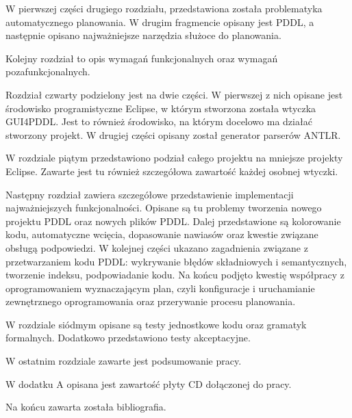 W pierwszej części drugiego rozdziału, przedstawiona została problematyka automatycznego planowania. W drugim fragmencie opisany jest PDDL, a następnie opisano najważniejsze narzędzia służoce do planowania.

Kolejny rozdział to opis wymagań funkcjonalnych oraz wymagań pozafunkcjonalnych.

Rozdział czwarty podzielony jest na dwie części. W pierwszej z nich opisane jest środowisko programistyczne Eclipse, w którym stworzona została wtyczka GUI4PDDL. Jest to również środowisko, na którym docelowo ma działać stworzony projekt. W drugiej części opisany został generator parserów ANTLR.

W rozdziale piątym przedstawiono podział całego projektu na mniejsze projekty Eclipse. Zawarte jest tu również szczegółowa zawartość każdej osobnej wtyczki.

Następny rozdział zawiera szczegółowe przedstawienie implementacji najważniejszych funkcjonalności. Opisane są tu problemy tworzenia nowego projektu PDDL oraz nowych plików PDDL. Dalej przedstawione są kolorowanie kodu, automatyczne wcięcia, dopasowanie nawiasów oraz kwestie związane obsługą podpowiedzi. W kolejnej części ukazano zagadnienia związane z przetwarzaniem kodu PDDL: wykrywanie błędów składniowych i semantycznych, tworzenie indeksu, podpowiadanie kodu. Na końcu podjęto kwestię współpracy z oprogramowaniem wyznaczającym plan, czyli konfiguracje i uruchamianie zewnętrznego oprogramowania oraz przerywanie procesu planowania.

W rozdziale siódmym opisane są testy jednostkowe kodu oraz gramatyk formalnych. Dodatkowo przedstawiono testy akceptacyjne.

W ostatnim rozdziale zawarte jest podsumowanie pracy.

W dodatku A opisana jest zawartość płyty CD dołączonej do pracy.

Na końcu zawarta została bibliografia.
